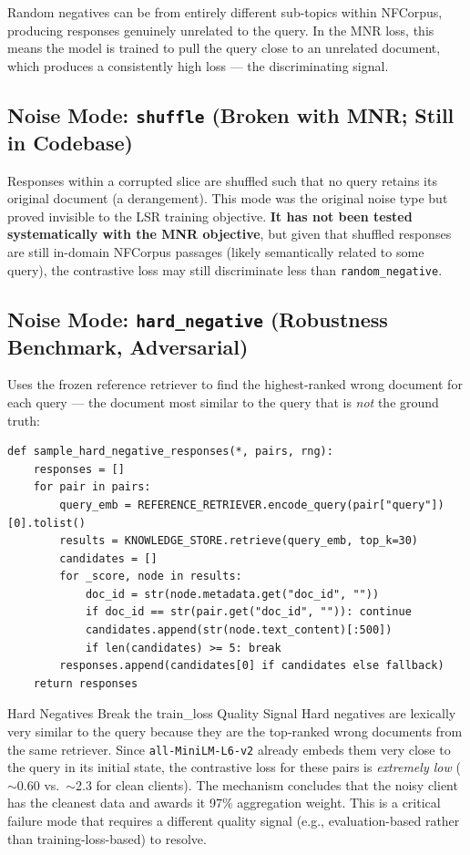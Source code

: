 \documentclass[12pt,a4paper]{article}
\begin{document}
Random negatives can be from entirely different sub-topics within NFCorpus, producing responses genuinely unrelated to the query. In the MNR loss, this means the model is trained to pull the query close to an unrelated document, which produces a consistently high loss --- the discriminating signal.

\subsection{Noise Mode: \texttt{shuffle} (Broken with MNR; Still in Codebase)}

Responses within a corrupted slice are shuffled such that no query retains its original document (a derangement). This mode was the original noise type but proved invisible to the LSR training objective. \textbf{It has not been tested systematically with the MNR objective}, but given that shuffled responses are still in-domain NFCorpus passages (likely semantically related to some query), the contrastive loss may still discriminate less than \texttt{random\_negative}.

\subsection{Noise Mode: \texttt{hard\_negative} (Robustness Benchmark, Adversarial)}

Uses the frozen reference retriever to find the highest-ranked wrong document for each query --- the document most similar to the query that is \textit{not} the ground truth:

\begin{lstlisting}[caption={Hard negative sampling using reference retriever}]
def sample_hard_negative_responses(*, pairs, rng):
    responses = []
    for pair in pairs:
        query_emb = REFERENCE_RETRIEVER.encode_query(pair["query"])[0].tolist()
        results = KNOWLEDGE_STORE.retrieve(query_emb, top_k=30)
        candidates = []
        for _score, node in results:
            doc_id = str(node.metadata.get("doc_id", ""))
            if doc_id == str(pair.get("doc_id", "")): continue
            candidates.append(str(node.text_content)[:500])
            if len(candidates) >= 5: break
        responses.append(candidates[0] if candidates else fallback)
    return responses
\end{lstlisting}

\begin{warnbox}{Hard Negatives Break the train\_loss Quality Signal}
Hard negatives are lexically very similar to the query because they are the top-ranked wrong documents from the same retriever. Since \texttt{all-MiniLM-L6-v2} already embeds them very close to the query in its initial state, the contrastive loss for these pairs is \textit{extremely low} ($\sim$0.60 vs.\ $\sim$2.3 for clean clients). The mechanism concludes that the noisy client has the cleanest data and awards it 97\% aggregation weight. This is a critical failure mode that requires a different quality signal (e.g., evaluation-based rather than training-loss-based) to resolve.
\end{warnbox}
\end{document}
